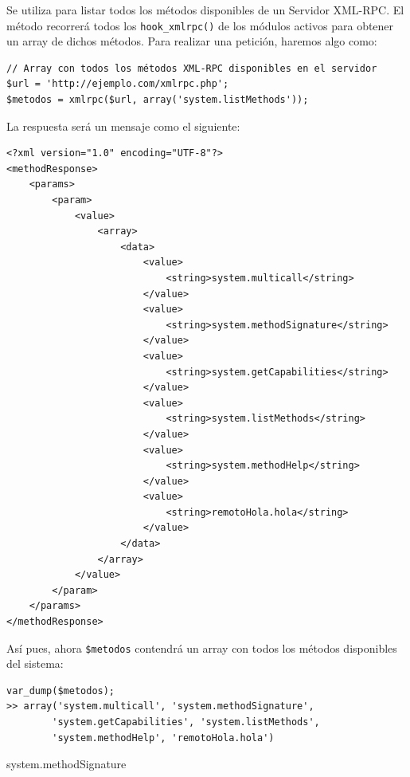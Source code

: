 Se utiliza para listar todos los métodos disponibles de un Servidor XML-RPC. El método recorrerá todos los \verb|hook_xmlrpc()| 
de los módulos activos para obtener un array de dichos métodos.  Para realizar una petición, haremos algo como:

\begin{verbatim}
// Array con todos los métodos XML-RPC disponibles en el servidor
$url = 'http://ejemplo.com/xmlrpc.php';
$metodos = xmlrpc($url, array('system.listMethods'));
\end{verbatim}

La respuesta será un mensaje como el siguiente:

\begin{verbatim}
<?xml version="1.0" encoding="UTF-8"?>
<methodResponse>
    <params>
        <param>
            <value>
                <array>
                    <data>
                        <value>
                            <string>system.multicall</string>
                        </value>
                        <value>
                            <string>system.methodSignature</string>
                        </value>
                        <value>
                            <string>system.getCapabilities</string>
                        </value>
                        <value>
                            <string>system.listMethods</string>
                        </value>
                        <value>
                            <string>system.methodHelp</string>
                        </value>
                        <value>
                            <string>remotoHola.hola</string>
                        </value>
                    </data>
                </array>
            </value>
        </param>
    </params>
</methodResponse>
\end{verbatim}

Así pues, ahora \verb|$metodos| contendrá un array con todos los métodos disponibles del sistema:

\begin{verbatim}
var_dump($metodos);
>> array('system.multicall', 'system.methodSignature',
		'system.getCapabilities', 'system.listMethods', 
		'system.methodHelp', 'remotoHola.hola')
\end{verbatim}

\large{system.methodSignature} 	
